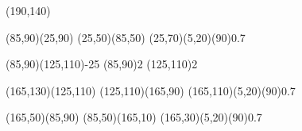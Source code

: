 \documentclass{standalone}
\begin{document}
\begin{axopicture}(190,140)

  \Line[arrow](85,90)(25,90)       %
  \Line[arrow](25,50)(85,50)       %
  \GOval(25,70)(5,20)(90){0.7}     %
                                   
  \Photon(85,90)(125,110){-2}{5}   %
  \Vertex(85,90){2}                %
  \Vertex(125,110){2}              %
                                   
  \Line[arrow](165,130)(125,110)   %
  \Line[arrow](125,110)(165,90)    %
  \GOval(165,110)(5,20)(90){0.7}   %
                                   
  \Line[arrow](165,50)(85,90)      %
  \Line[arrow](85,50)(165,10)      %
  \GOval(165,30)(5,20)(90){0.7}    %
                                   
\end{axopicture}
\end{document}

